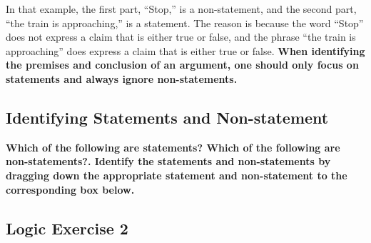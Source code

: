 \documentclass[
]{book}
\begin{document}
\begin{reflect}
In that example, the first part, ``Stop,'' is a non-statement, and the second part, ``the train is approaching,'' is a statement. The reason is because the word ``Stop'' does not express a claim that is either true or false, and the phrase ``the train is approaching'' does express a claim that is either true or false. \textbf{When identifying the premises and conclusion of an argument, one should only focus on statements and always ignore non-statements.}

\hypertarget{identifying-statements-and-non-statement}{%
\subsection*{Identifying Statements and Non-statement}\label{identifying-statements-and-non-statement}}

\textbf{Which of the following are statements? Which of the following are non-statements?. Identify the statements and non-statements by dragging down the appropriate statement and non-statement to the corresponding box below.}
\end{reflect}

\hypertarget{logic-exercise-2}{%
\subsection*{Logic Exercise 2}\label{logic-exercise-2}}
\end{document}
